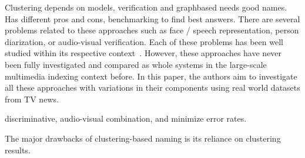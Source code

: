 Clustering depends on models, verification and graphbased needs good names. Has different pros and cons, benchmarking to find best answers.
There are several problems related to these approaches such as face / speech representation, person diarization, or audio-visual verification. Each of these problems has been well studied within its respective context~\cite{recog,veri,rep}. 
%
However, these approaches have never been fully investigated and compared as whole systems in the large-scale multimedia indexing context before. In this paper, the authors aim to investigate all these approaches with variations in their components using real world datasets from TV news. 

discriminative, audio-visual combination, and minimize error rates.

The major drawbacks of clustering-based naming is its reliance on clustering results. 

\endinput
